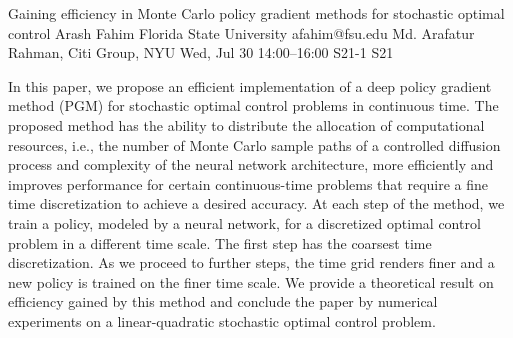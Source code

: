 \begin{talk}
  {Gaining efficiency in Monte Carlo policy gradient methods for stochastic optimal control}%
  {Arash Fahim}%
  {Florida State University}%
  {afahim@fsu.edu}%
  {Md. Arafatur Rahman, Citi Group, NYU}%
  {}%
  {Wed, Jul 30 14:00–16:00}%
  {S21-1}%
  {S21}%
  
				
			
In this paper, we propose an efficient implementation of a deep policy gradient method (PGM) for stochastic optimal control problems in continuous time. The proposed method has the ability to distribute the allocation of computational resources, i.e., the number of Monte Carlo  sample paths of a controlled diffusion process and complexity of the neural network architecture, more efficiently and improves performance for certain continuous-time problems that require a fine time discretization to achieve a desired accuracy. At each step of the method, we train a policy, modeled by a neural network, for a discretized optimal control problem in a different time scale. The first step has the coarsest time discretization. As we proceed to further steps, the time grid renders finer and a new policy is trained on the finer time scale. We provide a theoretical result on efficiency gained by this method and conclude the paper by numerical experiments on a linear-quadratic stochastic optimal control problem.

\medskip


\end{talk}

